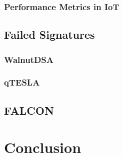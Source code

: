 \documentclass[conference]{IEEEtran}
\newcommand{\comment}[1]{}
\begin{document}
\subsubsection{Performance Metrics in IoT}
\comment{ %
- key/ exchange message/ signature size 
- cache/ ram usage

- setup(ms)  lifetime, pubk size, privk size, sig

'' small sized public key, small digital 
signature and a range of supported hash output sizes is 
recommended''\cite{QR_Iot_Lattice}

- most impls have quite large keys \cite{QR_comparison}
- key gen performance since many schemes have limited signatures \cite{QR_comparison}

- IoT evolves, when fast quantum is available iot will be better too  \cite{QR_comparison}
} %

\subsection{Failed Signatures}
\comment{ %
} %

\subsubsection{WalnutDSA}
\comment{ %
} %

\subsubsection{qTESLA}
\comment{ %
} %

\subsection{FALCON}
\comment{ %
falcon-512 (L1):
pubk/sig 897/690 bytes (dil3: 1472/2701 ecdsa: 64)
keygen: 182m clk , 118mJ (dil3: 2.3m / 1.7mJ ecdsa 5mJ)
sign/ver: 23.5/0.345 mJ (dil3 5mJ/1.7mJ ecdsa 4mJ)

falcon-1024 (L5):
pubk/sig 1793/1330 bytes
keygen: 380m clk , 232mJ
sign/ver: 45.5/0.69 mJ
\cite{Energy_comp}

} %


\section{Conclusion}
\comment{ %
- quantum fast evolving, active field of research
- smart home, smart campus, smart city
- quantum key distribution
\cite{QR_comparison}
} %



\end{document}
